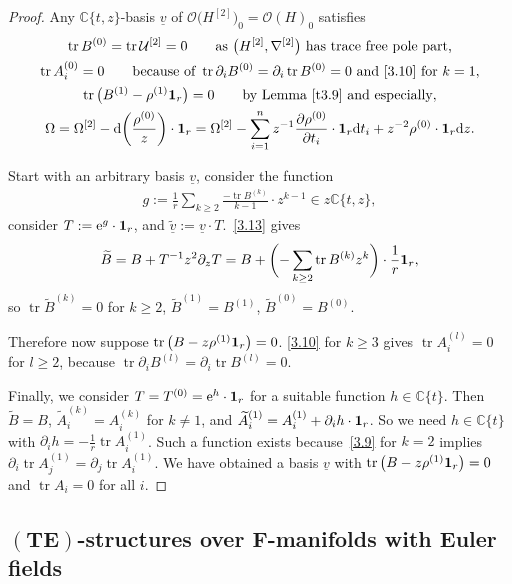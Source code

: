 \documentclass[pdftex]{sigma}%
\numberwithin{equation}{section}
\numberwithin{figure}{section}
\newcommand{\C}{{\mathbb C}}
\newcommand{\OO}{{\mathcal O}}
\newcommand{\UU}{{\mathcal U}}
\newcommand{\ddd}{{\rm d}}
\newcommand{\www}{\widetilde}
\newcommand{\uuuu}{\underline}
\newcommand{\paa}{\partial}
\newcommand{\nnn}{\nabla}
\DeclareMathOperator{\tr}{tr}
\begin{document}
\begin{proof}
Any $\C\{t,z\}$-basis $\uuuu{v}$ of
$\OO\big(H^{[2]}\big)_0=\OO(H)_0$ satisfies
\begin{gather*}
\tr B^{(0)}=\tr\UU^{[2]}=0 \qquad
\text{as}\ \big(H^{[2]},\nnn^{[2]}\big)\ \text{has trace free pole part,}
\\
\tr A_i^{(0)}=0 \qquad
\text{because of}\ \tr\paa_iB^{(0)}=\paa_i\tr B^{(0)}=0
\ \text{and}\ \eqref{3.10}\ \text{for}\ k=1 ,
\\
 \tr\big(B^{(1)}- \rho^{(1)}{\bf 1}_r\big)=0 \qquad
\text{by Lemma~\ref{t3.9} and especially},
\\
\Omega =\Omega^{[2]}-\ddd\bigg(\frac{\rho^{(0)}}{z}\bigg)\cdot{\bf 1}_r
=\Omega^{[2]}-\sum_{i=1}^n z^{-1}\frac{\paa\rho^{(0)}}{\paa t_i}
\cdot{\bf 1}_r\ddd t_i + z^{-2}\rho^{(0)}\cdot{\bf 1}_r \ddd z.
\end{gather*}

Start with an arbitrary basis $\uuuu{v}$,
consider the function
\begin{gather}\label{3.20}
g:=\frac{1}{r}\sum_{k\geq 2}
\frac{-\tr B^{(k)}}{k-1}\cdot z^{k-1}\in z\C\{t,z\},
\end{gather}
{\samepage
consider $T:={\rm e}^g\cdot{\bf 1}_r$, and
$\uuuu{\www v}:=\uuuu{v}\cdot T$.~\eqref{3.13} gives
\begin{gather*}
\www B=B+T^{-1}z^2\paa_z T = B+ \bigg({-}\sum_{k\geq 2}\tr B^{(k)}z^k\bigg)\cdot \frac{1}{r}{\bf 1}_r,
\end{gather*}
so $\tr \www B^{(k)}=0$ for $k\geq 2$, $\www B^{(1)}=B^{(1)}$,
$\www B^{(0)}=B^{(0)}$.}

Therefore now suppose $\tr \big(B-z\rho^{(1)}{\bf 1}_r\big)=0$.
\eqref{3.10} for $k\geq 3$ gives
$\tr A_i^{(l)}=0$ for $l\geq 2$, because
$\tr \paa_i B^{(l)}=\paa_i \tr B^{(l)}=0$.

Finally, we consider $T=T^{(0)}={\rm e}^h\cdot{\bf 1}_r$ for a
suitable function $h\in\C\{t\}$.
Then $\www B=B$, $\www A_i^{(k)}=A_i^{(k)}$ for $k\neq 1$,
and $\www A_i^{(1)}=A_i^{(1)}+\paa_i h\cdot{\bf 1}_r$.
So we need $h\in\C\{t\}$ with
$\paa_ih=-\frac{1}{r}\tr A_i^{(1)}$.
Such a function exists because~\eqref{3.9} for $k=2$
implies $\paa_i \tr A_j^{(1)}=\paa_j \tr A_i^{(1)}$.
We have obtained a basis $\uuuu{v}$ with
$\tr\big(B-z\rho^{(1)}{\bf 1}_r\big)=0$ and $\tr A_i=0$ for all $i$.
\end{proof}

\subsection[$(TE)$-structures over $F$-manifolds with Euler fields]{$\boldsymbol{(TE)}$-structures over $\boldsymbol{F}$-manifolds with Euler fields}%
\end{document}

